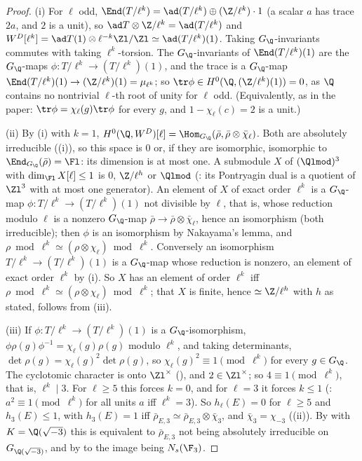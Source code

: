 \begin{proof}
(i) For $\ell$ odd, $\End(T/\ell^k)=\ad(T/\ell^k)\oplus(\Z/\ell^k)\cdot1$ (a scalar $a$ has trace $2a$, and $2$ is a unit), so $\ad T\otimes\Z/\ell^k=\ad(T/\ell^k)$ and
$W^D[\ell^k]=\ad T(1)\otimes\ell^{-k}\Zl/\Zl\simeq\ad(T/\ell^k)(1)$. Taking $G_\Q$-invariants commutes with taking $\ell^k$-torsion. The $G_\Q$-invariants of $\End(T/\ell^k)(1)$
are the $G_\Q$-maps $\phi\colon T/\ell^k\to(T/\ell^k)(1)$, and the trace is a $G_\Q$-map $\End(T/\ell^k)(1)\to(\Z/\ell^k)(1)=\mu_{\ell^k}$; so $\tr\phi\in H^0(\Q,(\Z/\ell^k)(1))=0$, as $\Q$
contains no nontrivial $\ell$-th root of unity for $\ell$ odd. (Equivalently, as in the paper: $\tr\phi=\chi_\ell(g)\tr\phi$ for every $g$, and $1-\chi_\ell(c)=2$ is a unit.)

(ii) By (i) with $k=1$, $H^0(\Q,W^D)[\ell]=\Hom_{G_\Q}(\bar\rho,\bar\rho\otimes\bar\chi_\ell)$. Both are absolutely irreducible ((i)), so this space is $0$
or, if they are isomorphic, isomorphic to $\End_{G_\Q}(\bar\rho)=\Fl$: its dimension is at most one. A submodule $X$ of $(\Qlmod)^3$ with $\dim_{\Fl}X[\ell]\le1$ is $0$, $\Z/\ell^h$
or $\Qlmod$ (: its Pontryagin dual is a quotient of $\Zl^3$ with at most one generator). An element of $X$ of exact order $\ell^k$ is a
$G_\Q$-map $\phi\colon T/\ell^k\to(T/\ell^k)(1)$ not divisible by $\ell$, that is, whose reduction modulo $\ell$ is a nonzero $G_\Q$-map $\bar\rho\to\bar\rho\otimes\bar\chi_\ell$, hence an
isomorphism (both irreducible); then $\phi$ is an isomorphism by Nakayama's lemma, and $\rho\bmod\ell^k\simeq(\rho\otimes\chi_\ell)\bmod\ell^k$. Conversely an isomorphism
$T/\ell^k\to(T/\ell^k)(1)$ is a $G_\Q$-map whose reduction is nonzero, an element of exact order $\ell^k$ by (i). So $X$ has an element of order $\ell^k$ iff
$\rho\bmod\ell^k\simeq(\rho\otimes\chi_\ell)\bmod\ell^k$; that $X$ is finite, hence $\simeq\Z/\ell^h$ with $h$ as stated, follows from (iii).

(iii) If $\phi\colon T/\ell^k\to(T/\ell^k)(1)$ is a $G_\Q$-isomorphism, $\phi\rho(g)\phi^{-1}=\chi_\ell(g)\rho(g)$ modulo $\ell^k$, and taking determinants,
$\det\rho(g)=\chi_\ell(g)^2\det\rho(g)$, so $\chi_\ell(g)^2\equiv1\pmod{\ell^k}$ for every $g\in G_\Q$. The cyclotomic character is onto $\Zl^\times$ (), and
$2\in\Zl^\times$; so $4\equiv1\pmod{\ell^k}$, that is, $\ell^k\mid3$. For $\ell\ge5$ this forces $k=0$, and for $\ell=3$ it forces $k\le1$ (: $a^2\equiv1\pmod{\ell^k}$
for all units $a$ iff $\ell^k=3$). So $h_\ell(E)=0$ for $\ell\ge5$ and $h_3(E)\le1$, with $h_3(E)=1$ iff $\bar\rho_{E,3}\simeq\bar\rho_{E,3}\otimes\bar\chi_3$, and $\bar\chi_3=\chi_{-3}$
((ii)). By  with $K=\Q(\sqrt{-3})$ this is equivalent to $\bar\rho_{E,3}$ not being absolutely irreducible on
$G_{\Q(\sqrt{-3})}$, and by  to the image being $N_s(\F_3)$.


\end{proof}
